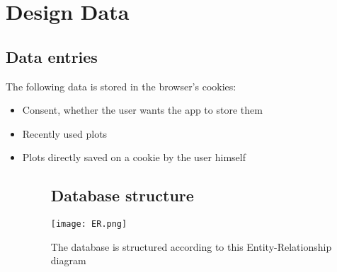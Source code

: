 \section{Design Data}

\subsection{Data entries}
The following data is stored in the browser's cookies:
\begin{itemize}
  \item Consent, whether the user wants the app to store them
  \item Recently used plots
  \item Plots directly saved on a cookie by the user himself

\begin{figure}[h!]
\subsection{Database structure}
  \centering
  \texttt{[image: ER.png]}
  \caption{The database is structured according to this Entity-Relationship diagram}
\end{figure}
\end{itemize}
